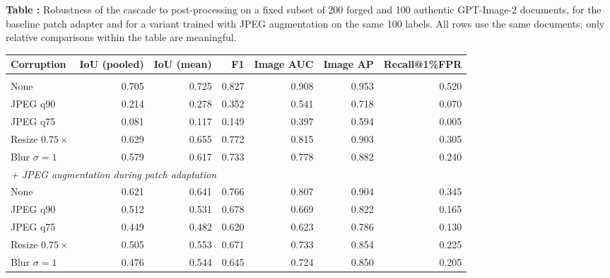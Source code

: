 \documentclass[preprint,12pt]{elsarticle}
\newcounter{tabno}
\newcommand{\tabcaption}[1]{\par\needspace{9\baselineskip}\refstepcounter{tabno}\noindent\textbf{Table \thetabno:} #1\par\vspace{2pt}}
\begin{document}
{
\tabcaption{Robustness of the cascade to post-processing on a fixed subset of 200 forged and 100 authentic GPT-Image-2 documents, for the baseline patch adapter and for a variant trained with JPEG augmentation on the same 100 labels. All rows use the same documents; only relative comparisons within the table are meaningful.}\label{tab:robust}
\begin{longtable}[]{@{}lrrrrrr@{}}
\toprule\noalign{}
Corruption & IoU (pooled) & IoU (mean) & F1 & Image AUC & Image AP & Recall@1\%FPR \\
\midrule\noalign{}
\endhead
\bottomrule\noalign{}
\endlastfoot
\multicolumn{7}{l}{\textit{Baseline patch adapter (no compression augmentation)}} \\
None & 0.705 & 0.725 & 0.827 & 0.908 & 0.953 & 0.520 \\
JPEG q90 & 0.214 & 0.278 & 0.352 & 0.541 & 0.718 & 0.070 \\
JPEG q75 & 0.081 & 0.117 & 0.149 & 0.397 & 0.594 & 0.005 \\
Resize $0.75\times$ & 0.629 & 0.655 & 0.772 & 0.815 & 0.903 & 0.305 \\
Blur $\sigma{=}1$ & 0.579 & 0.617 & 0.733 & 0.778 & 0.882 & 0.240 \\
\midrule
\multicolumn{7}{l}{\textit{+ JPEG augmentation during patch adaptation}} \\
None & 0.621 & 0.641 & 0.766 & 0.807 & 0.904 & 0.345 \\
JPEG q90 & 0.512 & 0.531 & 0.678 & 0.669 & 0.822 & 0.165 \\
JPEG q75 & 0.449 & 0.482 & 0.620 & 0.623 & 0.786 & 0.130 \\
Resize $0.75\times$ & 0.505 & 0.553 & 0.671 & 0.733 & 0.854 & 0.225 \\
Blur $\sigma{=}1$ & 0.476 & 0.544 & 0.645 & 0.724 & 0.850 & 0.205 \\
\end{longtable}
}
\end{document}
